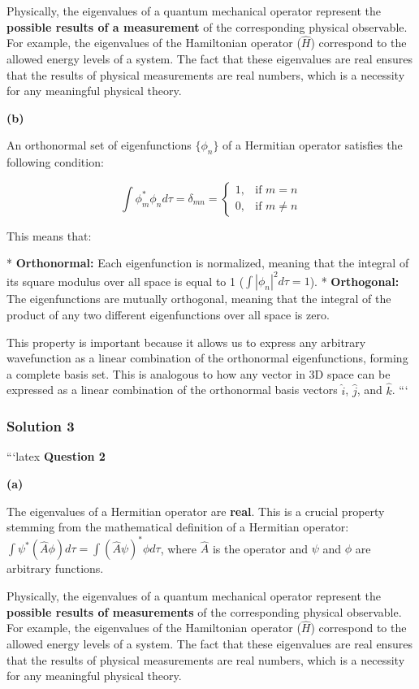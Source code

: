 \documentclass{article}
\begin{document}
Physically, the eigenvalues of a quantum mechanical operator represent the \textbf{possible results of a measurement} of the corresponding physical observable. For example, the eigenvalues of the Hamiltonian operator ($\hat{H}$) correspond to the allowed energy levels of a system. The fact that these eigenvalues are real ensures that the results of physical measurements are real numbers, which is a necessity for any meaningful physical theory. 

\textbf{(b)}

An orthonormal set of eigenfunctions $\{\phi_n\}$ of a Hermitian operator satisfies the following condition:

\begin{equation*}
\int \phi_m^* \phi_n d\tau = \delta_{mn} = 
\begin{cases}
1, & \text{if } m=n \\
0, & \text{if } m \neq n
\end{cases}
\end{equation*}

This means that:

* \textbf{Orthonormal:} Each eigenfunction is normalized, meaning that the integral of its square modulus over all space is equal to 1 ($\int |\phi_n|^2 d\tau = 1$).
* \textbf{Orthogonal:}  The eigenfunctions are mutually orthogonal, meaning that the integral of the product of any two different eigenfunctions over all space is zero.

This property is important because it allows us to express any arbitrary wavefunction as a linear combination of the orthonormal eigenfunctions, forming a complete basis set. This is analogous to how any vector in 3D space can be expressed as a linear combination of the orthonormal basis vectors $\hat{i}$, $\hat{j}$, and $\hat{k}$.
```

\subsubsection{Solution 3}
```latex
\textbf{Question 2}

\textbf{(a)} 

The eigenvalues of a Hermitian operator are \textbf{real}. This is a crucial property stemming from the mathematical definition of a Hermitian operator:  $\int \psi^* (\hat{A} \phi) d\tau = \int (\hat{A} \psi)^* \phi d\tau$, where $\hat{A}$ is the operator and $\psi$ and $\phi$ are arbitrary functions. 

Physically, the eigenvalues of a quantum mechanical operator represent the \textbf{possible results of measurements} of the corresponding physical observable. For example, the eigenvalues of the Hamiltonian operator ($\hat{H}$) correspond to the allowed energy levels of a system. The fact that these eigenvalues are real ensures that the results of physical measurements are real numbers, which is a necessity for any meaningful physical theory. 
\end{document}
